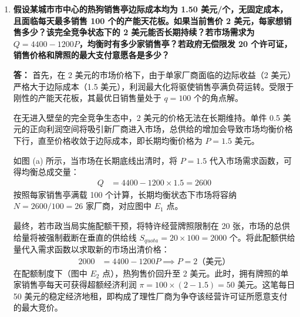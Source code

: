 \begin{enumerate}[label=\textbf{\arabic*.}, leftmargin=*]
\begin{center}
		\end{center}
		\newpage
		\item \textbf{假设某城市市中心的热狗销售亭边际成本均为 1.50 美元/个，无固定成本，且面临每天最多销售 100 个的产能天花板。如果当前售价 2 美元，每家想销售多少？该完全竞争状态下的 2 美元能否长期持续？若市场需求为 $Q = 4400 - 1200P$，均衡时有多少家销售亭？若政府无偿限发 20 个许可证，销售价格和牌照的最大支付意愿各是多少？}
		
		\textbf{答：}
		首先，在 2 美元的市场价格下，由于单家厂商面临的边际收益（2 美元）严格大于边际成本（1.5 美元），利润最大化将驱使销售亭满负荷运转。受限于刚性的产能天花板，其最优日销售量处于 $q = 100$ 个的角点解。
		
		在无进入壁垒的完全竞争生态中，2 美元的价格无法在长期维持。单件 0.5 美元的正向利润空间将吸引新厂商进入市场，总供给的增加会导致市场均衡价格下行，直至价格收敛于边际成本，即长期均衡价格为 $P = 1.5$ 美元。
		
		如图 (a) 所示，当市场在长期底线出清时，将 $P = 1.5$ 代入市场需求函数，可得均衡总成交量：
		\[
		\begin{aligned}
			Q &= 4400 - 1200 \times 1.5 = 2600
		\end{aligned}
		\]
		按照每家销售亭满载 100 个计算，长期均衡状态下市场将容纳 $N = 2600 / 100 = 26$ 家厂商，对应图中 $E_1$ 点。
		
		最终，若市政当局实施配额干预，将特许经营牌照限制在 20 张，市场的总供给量将被强制截断在垂直的供给线 $S_{quota} = 20 \times 100 = 2000$ 个。将此配额供给量代入需求函数以求取新的市场出清价格：
		\[
		\begin{aligned}
			2000 &= 4400 - 1200P \implies P = 2 \text{（美元）}
		\end{aligned}
		\]
		在配额制度下（图中 $E_2$ 点），热狗售价回升至 2 美元。此时，拥有牌照的单家销售亭每天可获得超额经济利润 $\pi = 100 \times (2 - 1.5) = 50$ 美元。这笔每日 50 美元的稳定经济地租，即构成了理性厂商为争夺该经营许可证所愿意支付的最大竞价。
		

\end{enumerate}
